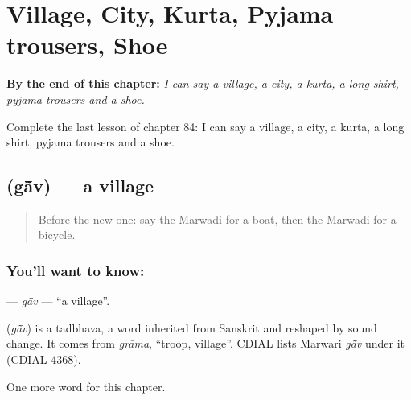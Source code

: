 
\chapter{Village, City, Kurta, Pyjama trousers, Shoe}
\label{ch:mw-village-city-kurta-pyjama-trousers-shoe}

\begin{chapteropening}
\textbf{By the end of this chapter:} \emph{I can say a village, a city, a kurta, a long shirt, pyjama trousers and a shoe.}

Complete the last lesson of chapter 84: I can say a village, a city, a kurta, a long shirt, pyjama trousers and a shoe.
\end{chapteropening}

\section[\texorpdfstring{\mw{गांव} (gā̃v)}{गांव (gā̃v)}]{ (gā̃v) — a village}

\label{lesson:MW-C84-gav}



\begin{quote}
Before the new one: say the Marwadi for a boat, then the Marwadi for a bicycle.
\end{quote}

\subsection*{You'll want to know: }
\textbf{} — \emph{gā̃v} — \textquotedblleft{}a village\textquotedblright{}.

\begin{cousinweb}
\textbf{} (\emph{gā̃v}) is a tadbhava, a word inherited from Sanskrit and reshaped by sound change. It comes from \emph{grāma}, \textquotedblleft{}troop, village\textquotedblright{}. CDIAL lists Marwari \emph{gā̃v} under it (CDIAL 4368).
\end{cousinweb}

\begin{grammarlens}[title={What you've built}]
One more word for this chapter.
\end{grammarlens}

